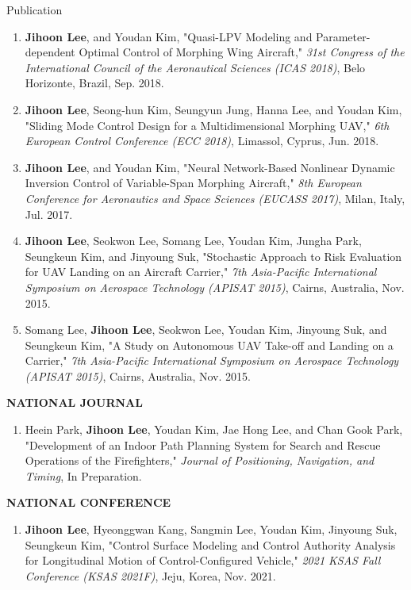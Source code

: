 \documentclass{resume} %
\begin{document}
\begin{rSection}{Publication}
\begin{enumerate}
		\item \textbf{Jihoon Lee}, and Youdan Kim, "Quasi-LPV Modeling and Parameter-dependent Optimal Control of Morphing Wing Aircraft," \textit{31st Congress of the International Council of the Aeronautical Sciences (ICAS 2018)}, Belo Horizonte, Brazil, Sep. 2018. 
		
		\item \textbf{Jihoon Lee}, Seong-hun Kim, Seungyun Jung, Hanna Lee, and Youdan Kim, "Sliding Mode Control Design for a Multidimensional Morphing UAV," \textit{6th European Control Conference (ECC 2018)}, Limassol, Cyprus, Jun. 2018. 
		
		\item \textbf{Jihoon Lee}, and Youdan Kim, "Neural Network-Based Nonlinear Dynamic Inversion Control of Variable-Span Morphing Aircraft," \textit{8th European Conference for Aeronautics and Space Sciences (EUCASS 2017)}, Milan, Italy, Jul. 2017. 
		
		\item \textbf{Jihoon Lee}, Seokwon Lee, Somang Lee, Youdan Kim, Jungha Park, Seungkeun Kim, and Jinyoung Suk, "Stochastic Approach to Risk Evaluation for UAV Landing on an Aircraft Carrier," \textit{7th Asia-Pacific International Symposium on Aerospace Technology (APISAT 2015)}, Cairns, Australia, Nov. 2015. 
		
		\item Somang Lee, \textbf{Jihoon Lee}, Seokwon Lee, Youdan Kim, Jinyoung Suk, and Seungkeun Kim, "A Study on Autonomous UAV Take-off and Landing on a Carrier," \textit{7th Asia-Pacific International Symposium on Aerospace Technology (APISAT 2015)}, Cairns, Australia, Nov. 2015. 
	\end{enumerate}\renewcommand{\labelenumi}{\theenumi.}
	
	\textbf{NATIONAL JOURNAL}
	\begin{enumerate}\renewcommand{\labelenumi}{[NJ.\theenumi]}
		\item Heein Park, \textbf{Jihoon Lee}, Youdan Kim, Jae Hong Lee, and Chan Gook Park, "Development of an Indoor Path Planning System for Search and Rescue Operations of the Firefighters," \textit{Journal of Positioning, Navigation, and Timing}, In Preparation.
	\end{enumerate}\renewcommand{\labelenumi}{\theenumi.}
	
	\textbf{NATIONAL CONFERENCE}
	\begin{enumerate}\renewcommand{\labelenumi}{[NC.\theenumi]}
		\item \textbf{Jihoon Lee}, Hyeonggwan Kang, Sangmin Lee, Youdan Kim, Jinyoung Suk, Seungkeun Kim, "Control Surface Modeling and Control Authority Analysis for Longitudinal Motion of Control-Configured Vehicle," \textit{2021 KSAS Fall Conference (KSAS 2021F)}, Jeju, Korea, Nov. 2021.
		

\end{enumerate}
\end{rSection}
\end{document}
